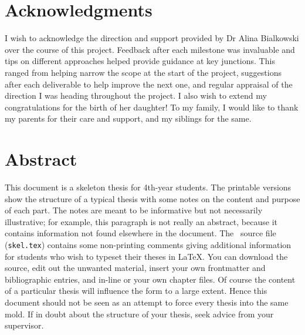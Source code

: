 \documentclass[12pt,openany,a4paper]{book}
\begin{document}
\frontmatter



\cleardoublepage



\cleardoublepage


\chapter{Acknowledgments}

I wish to acknowledge the direction and support provided by Dr Alina Bialkowski over the course of this project. Feedback after each milestone was invaluable and tips on different approaches helped provide guidance at key junctions. This ranged from helping narrow the scope at the start of the project, suggestions after each deliverable to help improve the next one, and regular appraisal of the direction I was heading throughout the project. I also wish to extend my congratulations for the birth of her daughter! To my family, I would like to thank my parents for their care and support, and my siblings for the same.
\cleardoublepage

\chapter{Abstract}

This document is a skeleton thesis for 4th-year students.  The
printable versions show the structure of a typical thesis with some notes on the content
and purpose of each part.  The notes are meant to be informative but
not necessarily illustrative; for example, this paragraph is not
really an abstract, because it contains information not found
elsewhere in the document.  The \LaTeXe\ source file
(\texttt{skel.tex}) contains some non-printing comments giving
additional information for students who wish to typeset their theses
in \LaTeX.  You can download the source, edit out the unwanted
material, insert your own frontmatter and bibliographic entries, and
in-line or \verb++ your own chapter files.  Of course the
content of a particular thesis will influence the form to a large
extent.  Hence this document should not be seen as an attempt to force
every thesis into the same mold.  If in doubt about the structure of
your thesis, seek advice from your supervisor.

\tableofcontents

\listoffigures
{}
\end{document}

